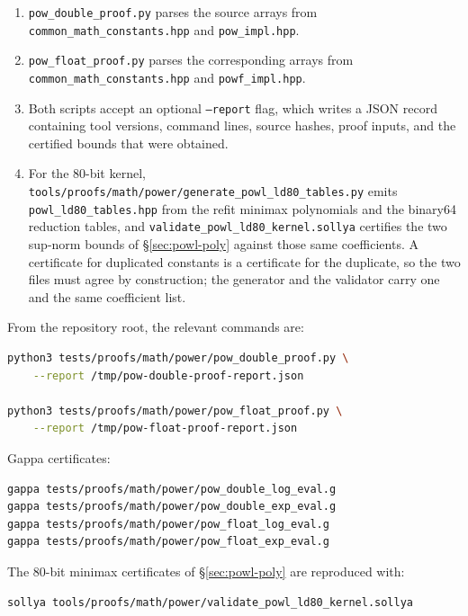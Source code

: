 \documentclass[11pt]{article}
\theoremstyle{plain}
\theoremstyle{remark}
\begin{document}
\begin{enumerate}
  \item \texttt{pow\_double\_proof.py} parses the source arrays from
    \texttt{common\_math\_constants.hpp} and
    \texttt{pow\_impl.hpp}.
  \item \texttt{pow\_float\_proof.py} parses the corresponding arrays from
    \texttt{common\_math\_constants.hpp} and
    \texttt{powf\_impl.hpp}.
  \item Both scripts accept an optional \texttt{--report} flag, which writes a
    JSON record containing tool versions, command lines, source hashes, proof
    inputs, and the certified bounds that were obtained.
  \item For the 80-bit kernel,
    \texttt{tools/proofs/math/power/generate\_powl\_ld80\_tables.py} emits
    \texttt{powl\_ld80\_tables.hpp} from the refit minimax polynomials and the
    binary64 reduction tables, and
    \texttt{validate\_powl\_ld80\_kernel.sollya} certifies the two sup-norm
    bounds of \S\ref{sec:powl-poly} against those same coefficients.  A
    certificate for duplicated constants is a certificate for the duplicate, so
    the two files must agree by construction; the generator and the validator
    carry one and the same coefficient list.
\end{enumerate}

From the repository root, the relevant commands are:

\begin{lstlisting}[language=bash]
python3 tests/proofs/math/power/pow_double_proof.py \
    --report /tmp/pow-double-proof-report.json

python3 tests/proofs/math/power/pow_float_proof.py \
    --report /tmp/pow-float-proof-report.json
\end{lstlisting}

Gappa certificates:

\begin{lstlisting}[language=bash]
gappa tests/proofs/math/power/pow_double_log_eval.g
gappa tests/proofs/math/power/pow_double_exp_eval.g
gappa tests/proofs/math/power/pow_float_log_eval.g
gappa tests/proofs/math/power/pow_float_exp_eval.g
\end{lstlisting}

The 80-bit minimax certificates of \S\ref{sec:powl-poly} are reproduced with:

\begin{lstlisting}[language=bash]
sollya tools/proofs/math/power/validate_powl_ld80_kernel.sollya
\end{lstlisting}
\end{document}
